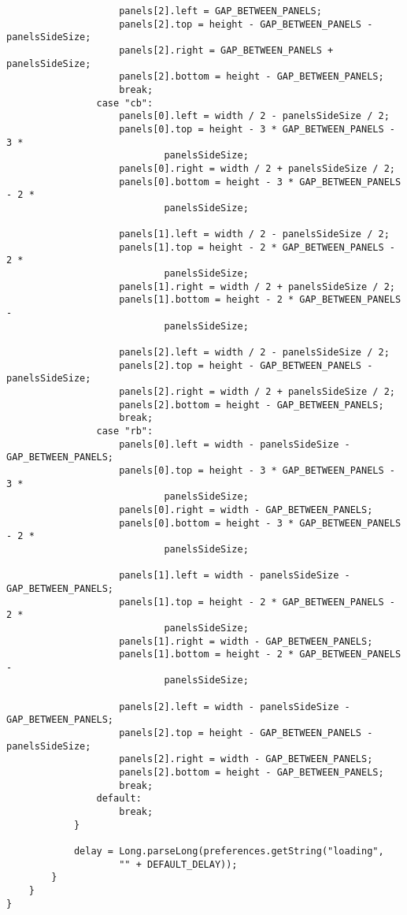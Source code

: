 \begin{verbatim}
                    panels[2].left = GAP_BETWEEN_PANELS;
                    panels[2].top = height - GAP_BETWEEN_PANELS - panelsSideSize;
                    panels[2].right = GAP_BETWEEN_PANELS + panelsSideSize;
                    panels[2].bottom = height - GAP_BETWEEN_PANELS;
                    break;
                case "cb":
                    panels[0].left = width / 2 - panelsSideSize / 2;
                    panels[0].top = height - 3 * GAP_BETWEEN_PANELS - 3 *
                            panelsSideSize;
                    panels[0].right = width / 2 + panelsSideSize / 2;
                    panels[0].bottom = height - 3 * GAP_BETWEEN_PANELS - 2 *
                            panelsSideSize;

                    panels[1].left = width / 2 - panelsSideSize / 2;
                    panels[1].top = height - 2 * GAP_BETWEEN_PANELS - 2 *
                            panelsSideSize;
                    panels[1].right = width / 2 + panelsSideSize / 2;
                    panels[1].bottom = height - 2 * GAP_BETWEEN_PANELS -
                            panelsSideSize;

                    panels[2].left = width / 2 - panelsSideSize / 2;
                    panels[2].top = height - GAP_BETWEEN_PANELS - panelsSideSize;
                    panels[2].right = width / 2 + panelsSideSize / 2;
                    panels[2].bottom = height - GAP_BETWEEN_PANELS;
                    break;
                case "rb":
                    panels[0].left = width - panelsSideSize - GAP_BETWEEN_PANELS;
                    panels[0].top = height - 3 * GAP_BETWEEN_PANELS - 3 *
                            panelsSideSize;
                    panels[0].right = width - GAP_BETWEEN_PANELS;
                    panels[0].bottom = height - 3 * GAP_BETWEEN_PANELS - 2 *
                            panelsSideSize;

                    panels[1].left = width - panelsSideSize - GAP_BETWEEN_PANELS;
                    panels[1].top = height - 2 * GAP_BETWEEN_PANELS - 2 *
                            panelsSideSize;
                    panels[1].right = width - GAP_BETWEEN_PANELS;
                    panels[1].bottom = height - 2 * GAP_BETWEEN_PANELS -
                            panelsSideSize;

                    panels[2].left = width - panelsSideSize - GAP_BETWEEN_PANELS;
                    panels[2].top = height - GAP_BETWEEN_PANELS - panelsSideSize;
                    panels[2].right = width - GAP_BETWEEN_PANELS;
                    panels[2].bottom = height - GAP_BETWEEN_PANELS;
                    break;
                default:
                    break;
            }

            delay = Long.parseLong(preferences.getString("loading",
                    "" + DEFAULT_DELAY));
        }
    }
}
\end{verbatim}

